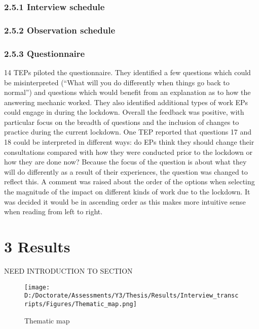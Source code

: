 \documentclass[
  english,
  man]{apa7}
\begin{document}
\hypertarget{interview-schedule}{%
\subsubsection{2.5.1 Interview schedule}\label{interview-schedule}}

\hypertarget{observation-schedule}{%
\subsubsection{2.5.2 Observation schedule}\label{observation-schedule}}

\hypertarget{questionnaire-2}{%
\subsubsection{2.5.3 Questionnaire}\label{questionnaire-2}}

14 TEPs piloted the questionnaire. They identified a few questions which could be misinterpreted (``What will you do differently when things go back to normal'') and questions which would benefit from an explanation as to how the answering mechanic worked. They also identified additional types of work EPs could engage in during the lockdown. Overall the feedback was positive, with particular focus on the breadth of questions and the inclusion of changes to practice during the current lockdown. One TEP reported that questions 17 and 18 could be interpreted in different ways: do EPs think they should change their consultations compared with how they were conducted prior to the lockdown or how they are done now? Because the focus of the question is about what they will do differently as a result of their experiences, the question was changed to reflect this. A comment was raised about the order of the options when selecting the magnitude of the impact on different kinds of work due to the lockdown. It was decided it would be in ascending order as this makes more intuitive sense when reading from left to right.

\hypertarget{results}{%
\section{3 Results}\label{results}}

NEED INTRODUCTION TO SECTION

\newpage
\blandscape

\begin{figure}
\centering
\texttt{[image: D:/Doctorate/Assessments/Y3/Thesis/Results/Interview\_transcripts/Figures/Thematic\_map.png]}
\caption{Thematic
map}
\end{figure}
\end{document}
